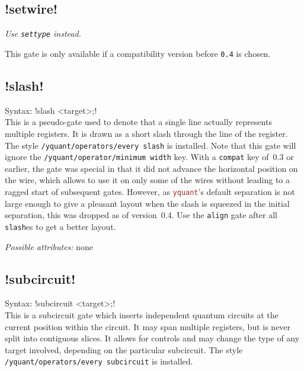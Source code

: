 \documentclass{scrartcl}
\def\pkg#1{\textcolor{brown}{\texttt{#1}}}
\def\ttlink{\link\texttt}
\def\Yquant{\pkg{yquant}}
\begin{document}
      \subsection[\texorpdfstring{\yquant{setwire}}{setwire}]{\yquant!setwire!}
         \emph{Use \ttlink{settype} instead.}

         This gate is only available if a compatibility version before \texttt{0.4} is chosen.

      \subsection[\texorpdfstring{\yquant{slash}}{slash}]{\yquant!slash!}
         Syntax: \yquant!slash <target>;! \\
         This is a pseudo\hyp gate used to denote that a single line actually represents multiple registers.
         It is drawn as a short slash through the line of the register.
         The style \ttlink{/yquant/operators/every slash} is installed.
         Note that this gate will ignore the \ttlink{/yquant/operator/minimum width} key.
         With a \ttlink{compat} key of~0.3 or earlier, the gate was special in that it did not advance the horizontal position on the wire, which allows to use it on only some of the wires without leading to a ragged start of subsequent gates.
         However, as \Yquant's default separation is not large enough to give a pleasant layout when the slash is squeezed in the initial separation, this was dropped as of version~0.4.
         Use the \ttlink{align} gate after all \ttlink{slash}es to get a better layout.

         \emph{Possible attributes:} none

      \subsection[\texorpdfstring{\yquant{subcircuit}}{subcircuit}]{\yquant!subcircuit!}
         Syntax: \yquant!subcircuit <target>;! \\
         This is a subcircuit gate which inserts independent quantum circuits at the current position within the circuit.
         It may span multiple registers, but is never split into contiguous slices.
         It allows for controls and may change the type of any target involved, depending on the particular subcircuit.
         The style \ttlink{/yquant/operators/every subcircuit} is installed.
\end{document}
